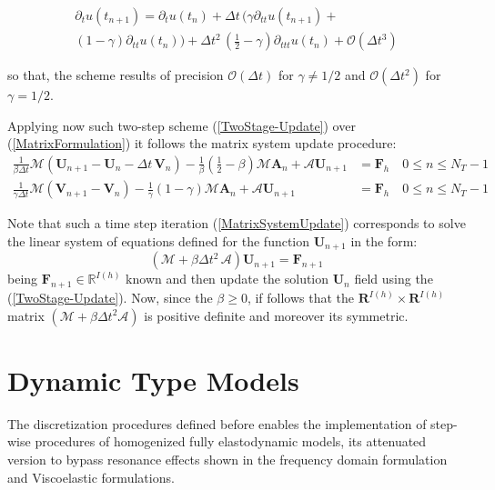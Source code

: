 \begin{multline}
    \partial_{t} u(t_{n+1}) = \partial_{t} u(t_n) + \Delta t\, \big( \gamma \partial_{tt} u(t_{n+1}) + \\
    (1-\gamma) \partial_{tt}u(t_n) \big) + \Delta t^2 \, (\frac{1}{2}-\gamma) \partial_{ttt} u(t_n) + \mathcal{O}(\Delta t^3)
\end{multline}

so that, the scheme results of precision $\mathcal{O}(\Delta t)$ for $\gamma \neq 1/2$ and $\mathcal{O}(\Delta t^2)$ for $\gamma = 1/2$.

Applying now such two-step scheme (\ref{TwoStage-Update}) over (\ref{MatrixFormulation}) it follows the matrix system update procedure:
\begin{align}
    \label{MatrixSystemUpdate}
    \frac{1}{\beta \Delta t} \mathcal{M}(\mathbf{U}_{n+1} - \mathbf{U}_{n} - \Delta t\, \mathbf{V}_n) - \frac{1}{\beta}(\frac{1}{2}- \beta) \mathcal{M}\mathbf{A}_n + \mathcal{A}\mathbf{U}_{n+1} &= \mathbf{F}_h \quad 0 \leq n \leq N_T-1 \\
    \frac{1}{\gamma \Delta t} \mathcal{M}(\mathbf{V}_{n+1} - \mathbf{V}_{n}) - \frac{1}{\gamma}(1-\gamma) \mathcal{M}\mathbf{A}_n + \mathcal{A}\mathbf{U}_{n+1} & = \mathbf{F}_h \quad 0 \leq n \leq N_T-1
\end{align}

Note that such a time step iteration (\ref{MatrixSystemUpdate}) corresponds to solve the linear system of equations defined for the function $\mathbf{U}_{n+1}$ in the form:
\begin{equation*}
    (\mathcal{M}+ \beta \Delta t^2 \, \mathcal{A}) \mathbf{U}_{n+1} = \mathbf{F}_{n+1}
\end{equation*}
being $\mathbf{F}_{n+1} \in \mathbb{R}^{I(h)}$ known and then update the solution $\mathbf{U}_n$ field using the (\ref{TwoStage-Update}).
Now, since the $\beta \geq 0$, if follows that the $\mathbf{R}^{I(h)} \times \mathbf{R}^{I(h)}$ matrix $(\mathcal{M}+ \beta \Delta t^2 \mathcal{A})$ is positive definite and moreover its symmetric. 

\section{Dynamic Type Models}
The discretization procedures defined before enables the implementation of step-wise procedures of homogenized fully elastodynamic models, its attenuated version to bypass resonance effects shown in the frequency domain formulation and Viscoelastic formulations.
